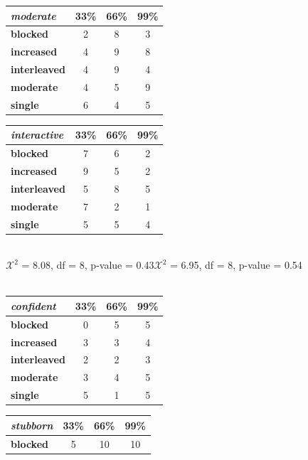 \documentclass{edm_template}
\begin{document}
\begin{table}[htbp]
 \begin{center}
\begin{tabular}{|l || c | c | c |}
\hline
\emph{moderate} &33\%&66\%&99\%\\ \hline \hline
  \textbf{blocked}&      2&  8& 3\\ \hline
\textbf{increased}&    4&  9&  8 \\ \hline
  \textbf{interleaved}&  4&  9&  4 \\ \hline
     \textbf{moderate}&     4&  5& 9 \\ \hline
       \textbf{single}&       6&  4&  5 \\ \hline
 \end{tabular}
\begin{tabular}{|l || c | c | c |}
\hline
\emph{interactive} &33\%&66\%&99\%\\ \hline \hline
  \textbf{blocked}&      7&  6& 2 \\ \hline
\textbf{increased}&    9&  5&  2 \\ \hline
  \textbf{interleaved}&  5&  8&  5 \\ \hline
     \textbf{moderate}&     7&  2& 1 \\ \hline
       \textbf{single}&       5&  5&  4 \\ \hline
 \end{tabular}
\\$\mathcal{X}^2$ = 8.08, df = 8, p-value = 0.43\hspace{15pt}$\mathcal{X}^2$ = 6.95, df = 8, p-value = 0.54\\ \hspace{0pt} \\
\begin{tabular}{|l || c | c | c |}
\hline
\emph{confident} &33\%&66\%&99\%\\ \hline \hline
  \textbf{blocked}&      0&  5& 5 \\ \hline
\textbf{increased}&    3&  3&  4 \\ \hline
  \textbf{interleaved}&  2&  2&  3 \\ \hline
     \textbf{moderate}&     3&  4& 5 \\ \hline
       \textbf{single}&       5& 1&  5 \\ \hline
 \end{tabular}
\begin{tabular}{|l || c | c | c |}
\hline
\emph{stubborn}&33\%&66\%&99\%\\ \hline \hline
  \textbf{blocked}&      5&  10& 10 \\ \hline

\end{tabular}
\end{center}
\end{table}
\end{document}
